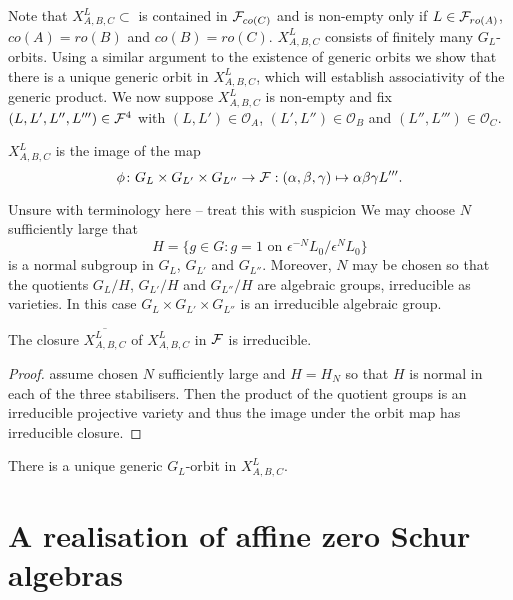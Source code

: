 \documentclass[a4paper, 11pt]{report}
\begin{document}
Note that $X_{A,B,C}^L\subset$ is contained in $\mathcal{F}_{co(C)}$ and is non-empty only if $L\in\mathcal{F}_{ro(A)}$, $co(A) = ro(B)$ and $co(B) = ro(C)$. $X_{A,B,C}^L$ consists of finitely many $G_L$-orbits. Using a similar argument to the existence of generic orbits we show that there is a unique generic orbit in $X_{A,B,C}^L$, which will establish associativity of the generic product. We now suppose $X_{A,B,C}^L$ is non-empty and fix $(L,L',L'',L''')\in\mathcal{F}^4$ with $(L,L')\in\mathcal{O}_A$, $(L',L'')\in\mathcal{O}_B$ and $(L'',L''')\in\mathcal{O}_C$.

\begin{lemma}
$X_{A,B,C}^L$ is the image of the map
\begin{equation*}
\phi\colon G_L\times G_{L'}\times G_{L''}\to \mathcal{F}: (\alpha,\beta,\gamma)\mapsto \alpha\beta\gamma L'''.
\end{equation*}
\end{lemma}

\begin{lemma}
{\color{red} Unsure with terminology here -- treat this with suspicion}
We may choose $N$ sufficiently large that
\begin{equation*}
H = \{g\in G: g=1 \text{ on } \epsilon^{-N}L_0/{\epsilon^N L_0}\}
\end{equation*}
is a normal subgroup in $G_L$, $G_{L'}$ and $G_{L''}$. Moreover, $N$ may be chosen so that the quotients $G_L/H$, $G_{L'}/H$ and $G_{L''}/H$ are algebraic groups, irreducible as varieties. In this case $G_L\times G_{L'}\times G_{L''}$ is an irreducible algebraic group.
\end{lemma}

\begin{proposition}
The closure $\overline{X_{A,B,C}^L}$ of $X_{A,B,C}^L$ in $\mathcal{F}$ is irreducible.
\end{proposition}
\begin{proof}
{\color{red} assume chosen $N$ sufficiently large and $H=H_N$ so that $H$ is normal in each of the three stabilisers. Then the product of the quotient groups is an irreducible projective variety and thus the image under the orbit map has irreducible closure.}
\end{proof}

\begin{proposition}
There is a unique generic $G_L$-orbit in $X_{A,B,C}^L$.
\end{proposition}

\chapter{A realisation of affine zero Schur algebras}
\end{document}
